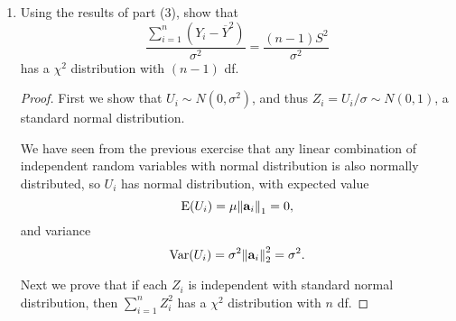 \documentclass[10pt]{article}
\begin{document}
\begin{enumerate}
\begin{proof}
\begin{align*}
				\sum_{i=1}^n (Y_i - \overline{Y})^2 &= \sum_{i=1}^n (Y_i^2 - 2Y_i\overline{Y} + \overline{Y}^2) \\
				&= \sum_{i=1}^n Y_i^2 - n \overline{Y}^2 \\
				&= \vb{Y}^{\top} A^{\top} A \vb{Y} - n \overline{Y}^2 \\
				&=
				\begin{bmatrix}
					\overline{Y} \sqrt{n}, &
					U_1, &
					U_2, &
					\cdots, &
					U_{n-1}
				\end{bmatrix}
				\begin{bmatrix}
					\overline{Y} \sqrt{n} \\
					U_1 \\
					U_2 \\
					\vdots \\
					U_{n-1}
				\end{bmatrix} - n \overline{Y}^2 \\
				&= \sum_{i=1}^{n-1} U_i^2
			\end{align*}
			Since $U_i$ is independent of $\overline{Y}$, $\sum_{i=1}^{n-1} U_i^2$ is also independet of $\overline{Y}$.
		\end{proof}
		\item Using the results of part (3), show that
		\begin{equation}
			\frac{\sum_{i=1}^n (Y_i - \overline{Y}^2)}{\sigma^2} = \frac{(n-1)S^2}{\sigma^2} \label{eq: chi squared n-1 df}
		\end{equation}
		has a $\chi^2$ distribution with $(n-1)$ df.
		\begin{proof}
			First we show that $U_i \sim N(0, \sigma^2)$, and thus $Z_i = U_i/\sigma \sim N(0, 1)$, a standard normal distribution.

			We have seen from the previous exercise that any linear combination of independent random variables with normal distribution is also normally distributed, so $U_i$ has normal distribution, with expected value
			\begin{equation}
				\operatorname{E}(U_i) = \mu \norm{\vb{a}_i}_1 = 0,
			\end{equation}
			and variance
			\begin{equation}
				\operatorname{Var}(U_i) = \sigma^2 \norm{\vb{a}_i}_2^2 = \sigma^2.
			\end{equation}

			Next we prove that if each $Z_i$ is independent with standard normal distribution, then $\sum_{i = 1}^n Z_i^2$ has a $\chi^2$ distribution with $n$ df.


\end{proof}
\end{enumerate}
\end{document}
